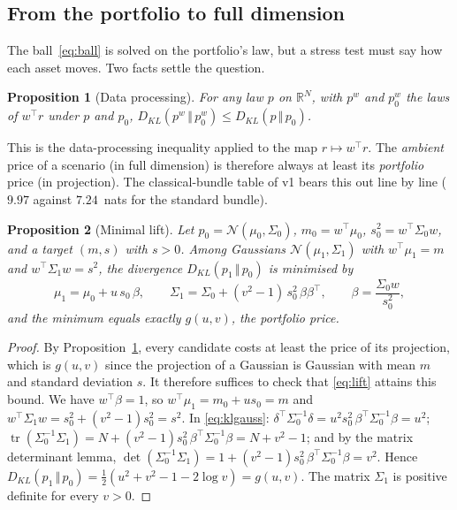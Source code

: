 \documentclass[11pt]{article}
\newtheorem{proposition}{Proposition}
\theoremstyle{definition}
\theoremstyle{remark}
\newcommand{\KL}[2]{D_{KL}\!\left(#1\,\Vert\,#2\right)}
\begin{document}
\subsection{From the portfolio to full dimension}

The ball~\eqref{eq:ball} is solved on the portfolio's law, but a stress test must
say how each asset moves. Two facts settle the question.

\begin{proposition}[Data processing]
\label{prop:dpi}
For any law $p$ on $\mathbb R^N$, with $p^w$ and $p_0^w$ the laws of $w^\top r$
under $p$ and $p_0$,
$\KL{p^w}{p_0^w}\le\KL{p}{p_0}$.
\end{proposition}

This is the data-processing inequality \citep{cover2006} applied to the map
$r\mapsto w^\top r$. The \emph{ambient} price of a scenario (in full dimension)
is therefore always at least its \emph{portfolio} price (in projection). The
classical-bundle table of v1 bears this out line by line ($9.97$ against
$7.24$~nats for the standard bundle).

\begin{proposition}[Minimal lift]
\label{prop:lift}
Let $p_0=\mathcal N(\mu_0,\Sigma_0)$, $m_0=w^\top\mu_0$, $s_0^2=w^\top\Sigma_0w$,
and a target $(m,s)$ with $s>0$. Among Gaussians $\mathcal N(\mu_1,\Sigma_1)$
with $w^\top\mu_1=m$ and $w^\top\Sigma_1w=s^2$, the divergence $\KL{p_1}{p_0}$
is minimised by
\begin{equation}
\label{eq:lift}
\mu_1=\mu_0+u\,s_0\,\beta,\qquad
\Sigma_1=\Sigma_0+(v^2-1)\,s_0^2\,\beta\beta^\top,
\qquad\beta=\frac{\Sigma_0w}{s_0^2},
\end{equation}
and the minimum equals exactly $g(u,v)$, the portfolio price.
\end{proposition}

\begin{proof}
By Proposition~\ref{prop:dpi}, every candidate costs at least the price of its
projection, which is $g(u,v)$ since the projection of a Gaussian is Gaussian
with mean $m$ and standard deviation $s$. It therefore suffices to check that
\eqref{eq:lift} attains this bound. We have $w^\top\beta=1$, so
$w^\top\mu_1=m_0+us_0=m$ and $w^\top\Sigma_1w=s_0^2+(v^2-1)s_0^2=s^2$. In
\eqref{eq:klgauss}: $\delta^\top\Sigma_0^{-1}\delta=u^2s_0^2\,\beta^\top\Sigma_0^{-1}\beta=u^2$;
$\operatorname{tr}(\Sigma_0^{-1}\Sigma_1)=N+(v^2-1)s_0^2\,\beta^\top\Sigma_0^{-1}\beta=N+v^2-1$;
and by the matrix determinant lemma,
$\det(\Sigma_0^{-1}\Sigma_1)=1+(v^2-1)s_0^2\,\beta^\top\Sigma_0^{-1}\beta=v^2$.
Hence $\KL{p_1}{p_0}=\tfrac12(u^2+v^2-1-2\log v)=g(u,v)$. The matrix $\Sigma_1$ is
positive definite for every $v>0$.
\end{proof}
\end{document}
